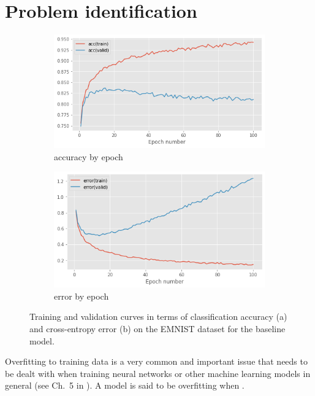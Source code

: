 \documentclass{article}
\begin{document}
\section{Problem identification}
\label{sec:task1}

\begin{figure}[t]
    \centering
    \begin{subfigure}{\linewidth}
        \includegraphics[width=\linewidth]{accuracy_IHO_withrelu.png}
        \caption{accuracy by epoch}
        \label{fig:example_acccurves}
    \end{subfigure} 
    \begin{subfigure}{\linewidth}
        \centering
        \includegraphics[width=\linewidth]{error_IHO_withrelu.png}
        \caption{error by epoch}
        \label{fig:example_errorcurves}
    \end{subfigure} 
    \caption{Training and validation curves in terms of classification accuracy (a) and cross-entropy error (b) on the EMNIST dataset for the baseline model.}
    \label{fig:example}
\end{figure} 

Overfitting to training data is a very common and important issue that needs to be dealt with when training neural networks or other machine learning models in general (see Ch.~5 in \citealt{Goodfellow-et-al-2016}).
A model is said to be overfitting when \questionFive.
\end{document}
